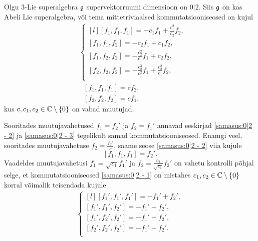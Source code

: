 \begin{lau} \label{lause:0|2 seosed}
    Olgu $3$-Lie superalgebra $\mathfrak{g}$ supervektorruumi dimensioon on $0|2$.
    Siis $\mathfrak{g}$ on kas Abeli Lie superalgebra, või tema mittetriviaalsed
    kommutatsiooniseosed on kujul
    \renewcommand\arraystretch{1.5}
    \begin{align}
        & \left\{
            \begin{matrix*}[l]
                [f_1, f_1, f_1] = -c_1 f_1 + \frac{c_1^2}{c_2} f_2, \\
                [f_1, f_1, f_2] = -c_2 f_1 + c_1 f_2, \\
                [f_1, f_2, f_2] = -\frac{c_2^2}{c_1} f_1 + c_2 f_2, \\
                [f_2, f_2, f_2] = -\frac{c_2^3}{c_1^2} f_1 +
                    \frac{c_2^2}{c_1} f_2, \\
            \end{matrix*}
        \right. \label{samasus:0|2 - 1} \\[0.2cm]
        &\ \ \ [f_1, f_1, f_1] = c f_2, \label{samasus:0|2 - 2} \\[0.2cm]
        &\ \ \ [f_2, f_2, f_2] = c f_1, \label{samasus:0|2 - 3}
    \end{align}
    \renewcommand\arraystretch{1}
    kus $c, c_1, c_2 \in \mathbb{C} \setminus \{ 0 \}$ on vabad muutujad.
\end{lau}

Sooritades muutujavahetused $f_1 = f_2'$ ja $f_2 = f_1'$ annavad
eeskirjad \eqref{samasus:0|2 - 2} ja \eqref{samasus:0|2 - 3}
tegelikult samad kommutatsiooniseosed. Enamgi veel, sooritades muutujavahetuse
$f_2 = \frac{f_2'}{c}$, saame seose \eqref{samasus:0|2 - 2} viia kujule
\[ [f_1, f_1, f_1] = f_2'. \]
Vaadeldes muutujavahetusi $f_1 = \sqrt{c_1} f_1'$ ja
$f_2 = \frac{c_2}{\sqrt{c_1}} f_2'$ on vahetu kontrolli põhjal selge, et
kommutatsiooniseosed \eqref{samasus:0|2 - 1} on mistahes
$c_1, c_2 \in \mathbb{C} \setminus \{0\}$ korral võimalik teisendada kujule
\begin{align*}
    \left\{
        \begin{matrix*}[l]
            [f_1', f_1', f_1'] = -f_1' + f_2', \\
            [f_1', f_1', f_2'] = -f_1' + f_2', \\
            [f_1', f_2', f_2'] = -f_1' + f_2', \\
            [f_2', f_2', f_2'] = -f_1' + f_2'. \\
        \end{matrix*}
    \right.
\end{align*}

